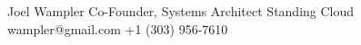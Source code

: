
\begin{referees}
		{Joel Wampler}
		{Co-Founder, Systems Architect}
		{Standing Cloud}
		{wampler@gmail.com}
    {+1 (303) 956-7610}
\end{referees}
